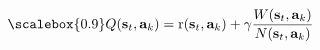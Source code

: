 \vspace{-0.2cm}
\begin{equation}
\scalebox{0.9}

Q(\textbf{s}_t, \textbf{a}_k) = \textrm{r}(\textbf{s}_t, \textbf{a}_k) + \gamma \frac{W(\textbf{s}_t, \textbf{a}_k)}{N(\textbf{s}_t, \textbf{a}_k)}
\label{eq:q_func}
\end{equation}